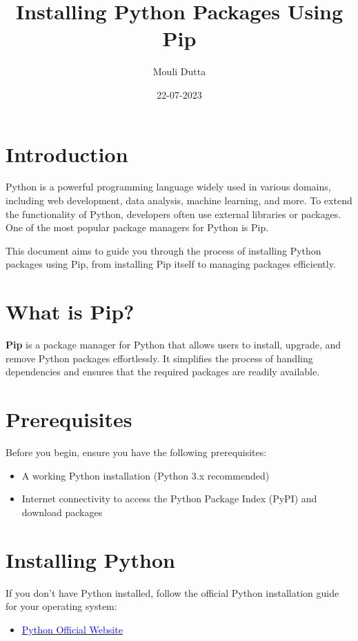 \documentclass[a4paper, 12pt]{report}
\title{Installing Python Packages Using Pip}
\author{Mouli Dutta}
\date{22-07-2023}
\begin{document}
    \maketitle
    \tableofcontents
    \newpage

    \section{Introduction}
        Python is a powerful programming language widely used in various domains, including web development, data analysis, machine learning, and more. To extend the functionality of Python, developers often use external libraries or packages. One of the most popular package managers for Python is Pip.

        This document aims to guide you through the process of installing Python packages using Pip, from installing Pip itself to managing packages efficiently.

    
    \section{What is Pip?}
        \textbf{Pip} is a package manager for Python that allows users to install, upgrade, and remove Python packages effortlessly. It simplifies the process of handling dependencies and ensures that the required packages are readily available.

        
    \section{Prerequisites}
        Before you begin, ensure you have the following prerequisites:
        \begin{itemize}
            \item A working Python installation (Python 3.x recommended)
            \item Internet connectivity to access the Python Package Index (PyPI) and download packages
        \end{itemize}


    \section{Installing Python}
        If you don't have Python installed, follow the official Python installation guide for your operating system:
        \begin{itemize}
            \item \href{https://www.python.org/downloads/}{\textcolor{blue}{Python Official Website}}
        \end{itemize}
\end{document}
